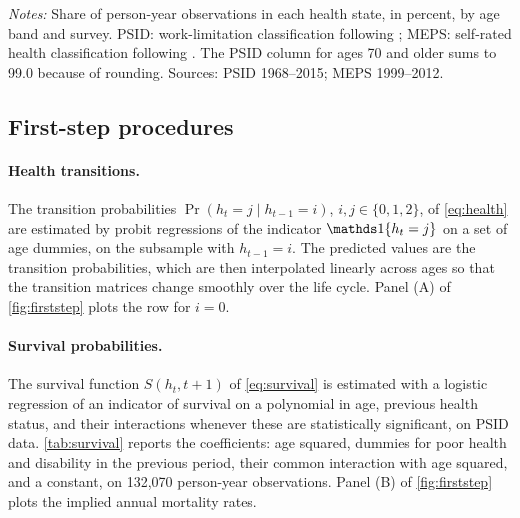 \begin{table}[!htbp]
\centering
\caption{Health Measures by Age Band in the Two Surveys}
\label{tab:health}
\vspace{6pt}
\footnotesize
\begin{threeparttable}

\begin{tablenotes}[flushleft]\scriptsize
\item[] \textit{Notes:} Share of person-year observations in each health state, in percent, by age band and survey. PSID: work-limitation classification following \citet{Low2015}; MEPS: self-rated health classification following \citet{Pashchenko2019}. The PSID column for ages 70 and older sums to 99.0 because of rounding. Sources: PSID 1968--2015; MEPS 1999--2012.
\end{tablenotes}
\end{threeparttable}
\end{table}

\subsection{First-step procedures}\label{app:firststep}

\paragraph{Health transitions.}
The transition probabilities $\Pr(h_t=j\mid h_{t-1}=i)$, $i,j\in\{0,1,2\}$, of \eqref{eq:health} are estimated by probit regressions of the indicator $\ind{h_t=j}$ on a set of age dummies, on the subsample with $h_{t-1}=i$. %
The predicted values are the transition probabilities, which are then interpolated linearly across ages so that the transition matrices change smoothly over the life cycle. %
Panel (A) of \autoref{fig:firststep} plots the row for $i=0$.

\paragraph{Survival probabilities.}
The survival function $S(h_t,t+1)$ of \eqref{eq:survival} is estimated with a logistic regression of an indicator of survival on a polynomial in age, previous health status, and their interactions whenever these are statistically significant, on PSID data. %
\autoref{tab:survival} reports the coefficients: age squared, dummies for poor health and disability in the previous period, their common interaction with age squared, and a constant, on 132,070 person-year observations. %
Panel (B) of \autoref{fig:firststep} plots the implied annual mortality rates.

